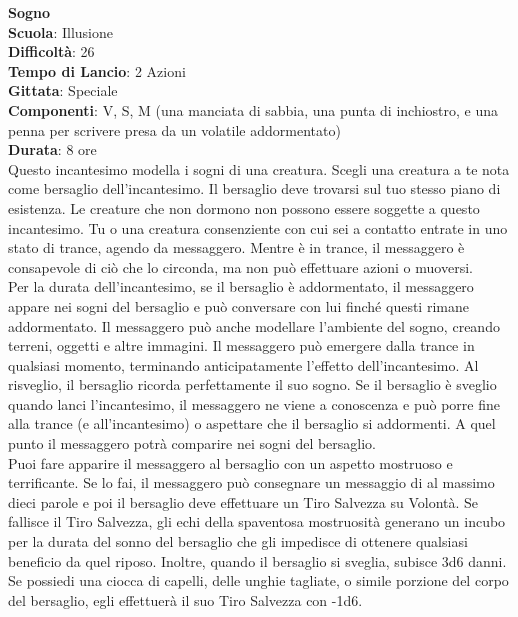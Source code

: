 \begin{multicols}{2}
\medskip\textbf{Sogno}\\
\textbf{Scuola}: Illusione\\
\textbf{Difficoltà}: 26\\
\textbf{Tempo di Lancio}: 2 Azioni\\
\textbf{Gittata}: Speciale\\
\textbf{Componenti}: V, S, M (una manciata di sabbia, una punta di inchiostro, e una penna per scrivere presa da un volatile addormentato)\\
\textbf{Durata}: 8 ore\\
Questo incantesimo modella i sogni di una creatura. Scegli una creatura a te nota come bersaglio dell'incantesimo. Il bersaglio deve trovarsi sul tuo stesso piano di esistenza. Le creature che non dormono non possono essere soggette a questo incantesimo. Tu o una creatura consenziente con cui sei a contatto entrate in uno stato di trance, agendo da messaggero. Mentre è in trance, il messaggero è consapevole di ciò che lo circonda, ma non può effettuare azioni o muoversi.\\
Per la durata dell'incantesimo, se il bersaglio è addormentato, il messaggero appare nei sogni del bersaglio e può conversare con lui finché questi rimane addormentato. Il messaggero può anche modellare l'ambiente del sogno, creando terreni, oggetti e altre immagini. Il messaggero può emergere dalla trance in qualsiasi momento, terminando anticipatamente l'effetto dell'incantesimo. Al risveglio, il bersaglio ricorda perfettamente il suo sogno. Se il bersaglio è sveglio quando lanci l'incantesimo, il messaggero ne viene a conoscenza e può porre fine alla trance (e all'incantesimo) o aspettare che il bersaglio si addormenti. A quel punto il messaggero potrà comparire nei sogni del bersaglio.\\
Puoi fare apparire il messaggero al bersaglio con un aspetto mostruoso e terrificante. Se lo fai, il messaggero può consegnare un messaggio di al massimo dieci parole e poi il bersaglio deve effettuare un Tiro Salvezza su Volontà. Se fallisce il Tiro Salvezza, gli echi della spaventosa mostruosità generano un incubo per la durata del sonno del bersaglio che gli impedisce di ottenere qualsiasi beneficio da quel riposo. Inoltre, quando il bersaglio si sveglia, subisce 3d6 danni.\\
Se possiedi una ciocca di capelli, delle unghie tagliate, o simile porzione del corpo del bersaglio, egli effettuerà il suo Tiro Salvezza con -1d6.


\end{multicols}
